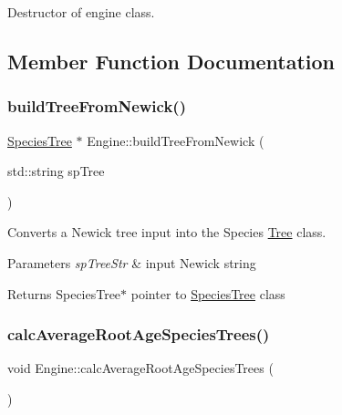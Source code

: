Destructor of engine class. 



\subsection{Member Function Documentation}
\mbox{\label{class_engine_a0e10774c53dd9d241023ffa2f803d4dd}} 
\subsubsection{\texorpdfstring{buildTreeFromNewick()}{buildTreeFromNewick()}}
{\footnotesize\ttfamily \mbox{\hyperlink{class_species_tree}{Species\+Tree}} $\ast$ Engine\+::build\+Tree\+From\+Newick (\begin{DoxyParamCaption}\item[{std\+::string}]{sp\+Tree }\end{DoxyParamCaption})}



Converts a Newick tree input into the Species \mbox{\hyperlink{class_tree}{Tree}} class. 


\begin{DoxyParams}{Parameters}
{\em sp\+Tree\+Str} & input Newick string \\
\hline
\end{DoxyParams}
\begin{DoxyReturn}{Returns}
Species\+Tree$\ast$ pointer to \mbox{\hyperlink{class_species_tree}{Species\+Tree}} class 
\end{DoxyReturn}
\mbox{\label{class_engine_ab7a0c2386843e3671a8df154566733f7}} 
\subsubsection{\texorpdfstring{calcAverageRootAgeSpeciesTrees()}{calcAverageRootAgeSpeciesTrees()}}
{\footnotesize\ttfamily void Engine\+::calc\+Average\+Root\+Age\+Species\+Trees (\begin{DoxyParamCaption}{ }\end{DoxyParamCaption})}



